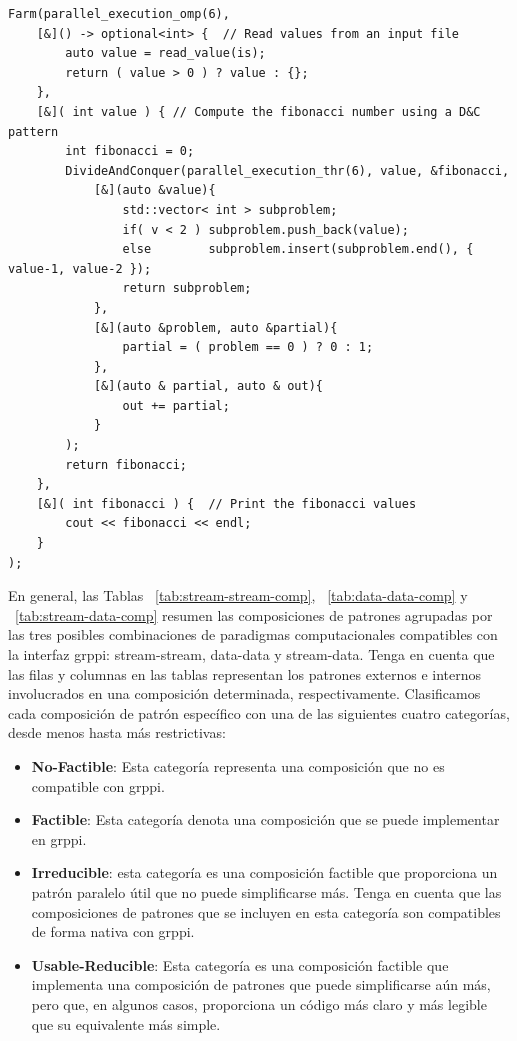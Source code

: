 \vspace{0.35cm}
\begin{lstlisting}[frame=single,label={code:stream-data-comp},caption={Ejemplo de composición Farm-Divide\&Conquer.}]
Farm(parallel_execution_omp(6),
    [&]() -> optional<int> {  // Read values from an input file
        auto value = read_value(is);
        return ( value > 0 ) ? value : {};
    },
    [&]( int value ) { // Compute the fibonacci number using a D&C pattern    
        int fibonacci = 0;
        DivideAndConquer(parallel_execution_thr(6), value, &fibonacci,
            [&](auto &value){
                std::vector< int > subproblem;
                if( v < 2 ) subproblem.push_back(value);
                else        subproblem.insert(subproblem.end(), { value-1, value-2 });
                return subproblem;
            },
            [&](auto &problem, auto &partial){
                partial = ( problem == 0 ) ? 0 : 1;
            },
            [&](auto & partial, auto & out){
                out += partial;
            }
        );
        return fibonacci;
    },
    [&]( int fibonacci ) {  // Print the fibonacci values 
        cout << fibonacci << endl;
    }
);
\end{lstlisting}
\vspace{0.35cm}

En general, las Tablas ~\ref{tab:stream-stream-comp}, ~\ref{tab:data-data-comp} y ~\ref{tab:stream-data-comp} resumen las composiciones de patrones agrupadas por las tres posibles combinaciones de paradigmas computacionales compatibles con la interfaz \acrshort{grppi}: stream-stream, data-data y stream-data. Tenga en cuenta que las filas y columnas en las tablas representan los patrones externos e internos involucrados en una composición determinada, respectivamente. Clasificamos cada composición de patrón específico con una de las siguientes cuatro categorías, desde menos hasta más restrictivas:

\begin{itemize}
    \item \textbf{No-Factible}: Esta categoría representa una composición que no es compatible con \acrshort{grppi}.
    \item \textbf{Factible}: Esta categoría denota una composición que se puede implementar en \acrshort{grppi}.
    \item \textbf{Irreducible}: esta categoría es una composición factible que proporciona un patrón paralelo útil que no puede simplificarse más. Tenga en cuenta que las composiciones de patrones que se incluyen en esta categoría son compatibles de forma nativa con \acrshort{grppi}.
    \item \textbf{Usable-Reducible}: Esta categoría es una composición factible que implementa una composición de patrones que puede simplificarse aún más, pero que, en algunos casos, proporciona un código más claro y más legible que su equivalente más simple.
\end{itemize}

